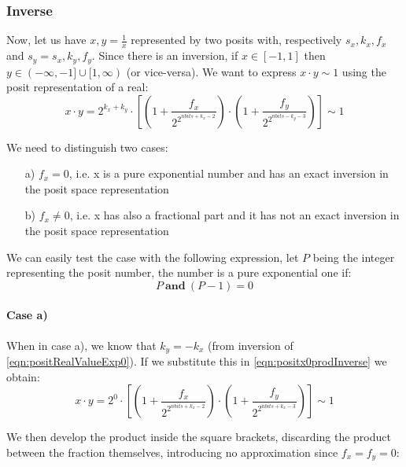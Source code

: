 \subsubsection{Inverse}

Now, let us have $x, y = \frac{1}{x}$ represented  by two posits with, respectively $s_x,k_x, f_x$ and $s_y = s_x, k_y, f_y$. Since there is an inversion, if $x \in [-1,1]$ then $y \in (-\infty, -1] \cup [1,\infty)$ (or vice-versa). We want to express $x \cdot y \sim 1$ using the posit representation of a real:
\begin{equation}\label{eqn:positx0prodInverse}
    x \cdot y = 2^{k_x+k_y} \cdot \left[ \left (1 + \frac{f_x}{2^{2^{nbits + k_x - 2}}} \right ) \cdot \left (1 + \frac{f_y}{2^{2^{nbits - k_y - 3}}} \right ) \right] \sim 1
\end{equation}

We need to distinguish two cases:
\begin{itemize}
    \item[a)]$f_x = 0$, i.e. x is a pure exponential number and has an exact inversion in the posit space representation
    \item[b)] $f_x \neq 0$, i.e. x has also a fractional part and it has not an exact inversion in the posit space representation
\end{itemize}

We can easily test the case with the following expression, let $P$ being the integer representing the posit number, the number is a pure exponential one if: 
\begin{equation}
    P\ \mathbf{and}\ (P - 1) = 0
\end{equation}

\paragraph{Case a)} When in case a), we know that $k_y = -k_x$ (from inversion of \eqref{eqn:positRealValueExp0}). If we substitute this in \eqref{eqn:positx0prodInverse} we obtain:
\begin{equation}
    x \cdot y = 2^{0} \cdot \left[ \left (1 + \frac{f_x}{2^{2^{nbits + k_x - 2}}} \right ) \cdot \left (1 + \frac{f_y}{2^{2^{nbits + k_x - 3}}} \right ) \right] \sim 1
\end{equation}

We then develop the product inside the square brackets, discarding the product between the fraction themselves, introducing no approximation since $f_x = f_y = 0$:

